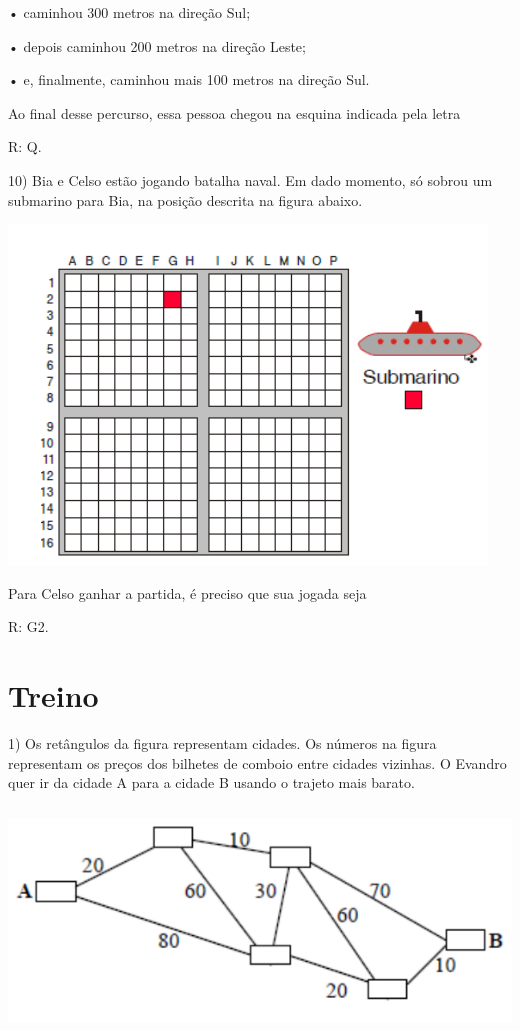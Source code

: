 • caminhou 300 metros na direção Sul;

• depois caminhou 200 metros na direção Leste;

• e, finalmente, caminhou mais 100 metros na direção Sul.

Ao final desse percurso, essa pessoa chegou na esquina indicada pela
letra

R: Q.

10) Bia e Celso estão jogando batalha naval. Em dado momento, só sobrou
um submarino para Bia, na posição descrita na figura abaixo.

\includegraphics[width=5in,height=3.55208in]{./imgSAEB_6_MAT/media/image73.png}

Para Celso ganhar a partida, é preciso que sua jogada seja

R: G2.

\section{Treino}

1) Os retângulos da figura representam cidades. Os números na figura
representam os preços dos bilhetes de comboio entre cidades vizinhas. O
Evandro quer ir da cidade A para a cidade B usando o trajeto mais
barato.

\includegraphics[width=5.90625in,height=2.38542in]{./imgSAEB_6_MAT/media/image74.png}


